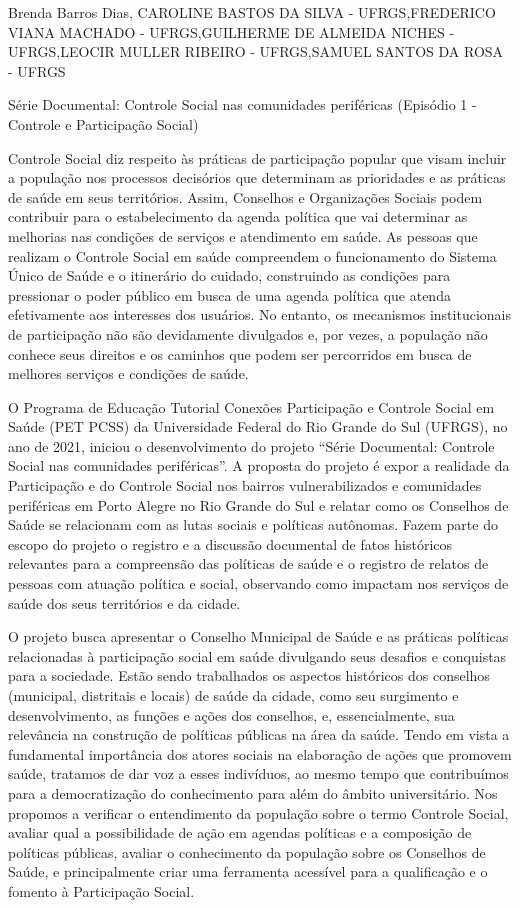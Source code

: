 Brenda Barros Dias, CAROLINE BASTOS DA SILVA - UFRGS,FREDERICO VIANA MACHADO - UFRGS,GUILHERME DE ALMEIDA NICHES - UFRGS,LEOCIR MULLER RIBEIRO - UFRGS,SAMUEL SANTOS DA ROSA - UFRGS

Série Documental: Controle Social nas comunidades periféricas  (Episódio 1 - Controle e Participação Social)

Controle Social diz respeito às práticas de participação popular que visam incluir a população nos processos decisórios que determinam as prioridades e as práticas de saúde em seus territórios. Assim, Conselhos e Organizações Sociais podem contribuir para o estabelecimento da agenda política que vai determinar as melhorias nas condições de serviços e atendimento em saúde. As pessoas que realizam o Controle Social em saúde compreendem o funcionamento do Sistema Único de Saúde e o itinerário do cuidado, construindo as condições para pressionar o poder público em busca de uma agenda política que atenda efetivamente aos interesses dos usuários. No entanto, os mecanismos institucionais de participação não são devidamente divulgados e, por vezes, a população não conhece seus direitos e os caminhos que podem ser percorridos em busca de melhores serviços e condições de saúde. 

O Programa de Educação Tutorial Conexões Participação e Controle Social em Saúde (PET PCSS) da Universidade Federal do Rio Grande do Sul (UFRGS), no ano de 2021, iniciou o desenvolvimento do projeto “Série Documental: Controle Social nas comunidades periféricas”. A proposta do projeto é expor a realidade da Participação e do Controle Social nos bairros vulnerabilizados e comunidades periféricas em Porto Alegre no Rio Grande do Sul e relatar como os Conselhos de Saúde se relacionam com as lutas sociais e políticas autônomas. Fazem parte do escopo do projeto o registro e a discussão documental de fatos históricos relevantes para a compreensão das políticas de saúde e o registro de relatos de pessoas com atuação política e social, observando como impactam nos serviços de saúde dos seus territórios e da cidade.

O projeto busca apresentar o Conselho Municipal de Saúde e as práticas políticas relacionadas à participação social em saúde divulgando seus desafios e conquistas para a sociedade. Estão sendo trabalhados os aspectos históricos dos conselhos (municipal, distritais e locais) de saúde da cidade, como seu surgimento e desenvolvimento, as funções e ações dos conselhos, e, essencialmente, sua relevância na construção de políticas públicas na área da saúde. Tendo em vista a fundamental importância dos atores sociais na elaboração de ações que promovem saúde, tratamos de dar voz a esses indivíduos, ao mesmo tempo que contribuímos para a democratização do conhecimento para além do âmbito universitário. Nos propomos a verificar o entendimento da população sobre o termo Controle Social, avaliar qual a possibilidade de ação em agendas políticas e a composição de políticas públicas, avaliar o conhecimento da população sobre os Conselhos de Saúde, e principalmente criar uma ferramenta acessível para a qualificação e o  fomento à Participação Social.

